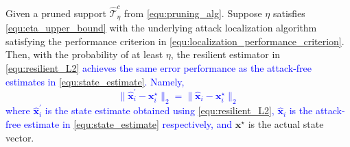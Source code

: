 \begin{theorem}\label{Thm:resilient_estimation_gaurentee}
Given a pruned support $\hat{\mathcal{T}}_{\eta}^c$ from \eqref{equ:pruning_alg}. Suppose $\eta$ satisfies \eqref{equ:eta_upper_bound} with the underlying attack localization algorithm satisfying the performance criterion in \eqref{equ:localization_performance_criterion}. Then, with the probability of at least $\eta$, the resilient estimator in \eqref{equ:resilient_L2}  \textcolor{blue}{achieves the same error performance as the attack-free estimates in \eqref{equ:state_estimate}. Namely,}
\textcolor{blue}{\begin{equation}\label{equ:error_bound}
    \|\hat{\mathbf{x}}_i^{'}-\mathbf{x}_i^{\star}\|_2 = \|\hat{\mathbf{x}}_i-\mathbf{x}_i^{\star}\|_2 
\end{equation} 
where $\hat{\mathbf{x}}_i^{'}$ is the state estimate obtained using \eqref{equ:resilient_L2}, $\hat{\mathbf{x}}_i$ is the attack-free estimate in \eqref{equ:state_estimate} respectively, and} $\mathbf{x}^{\star}$ is the actual state vector.
\end{theorem}
